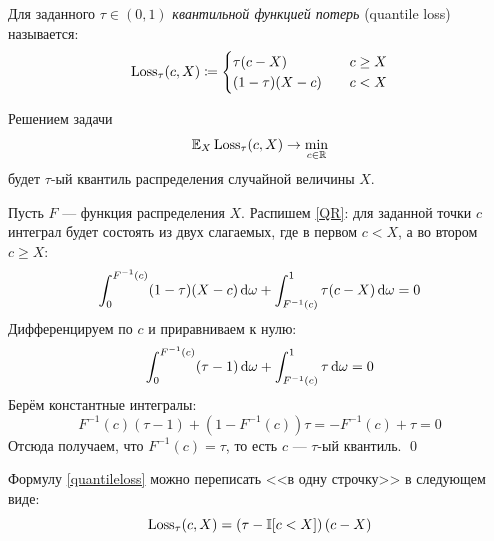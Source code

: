 \begin{definition}
Для заданного $\tau \in (0, 1)$ \emph{квантильной функцией потерь} (quantile loss) называется:
\begin{equation}\label{quantileloss}
\operatorname{Loss}_{\tau}(c, X) \coloneqq \begin{cases}
\tau (c - X) \quad &c \ge X \\
(1 - \tau) (X - c) \quad &c < X \\
\end{cases}
\end{equation}
\end{definition}

\begin{theorem} Решением задачи
\begin{equation}\label{QR}
\mathbb{E}_X \operatorname{Loss}_{\tau}(c, X) \to \min_{c \in \mathbb{R}}
\end{equation}
будет $\tau$-ый квантиль распределения случайной величины $X$.

\beginproof
Пусть $F$ --- функция распределения $X$. Распишем \eqref{QR}: для заданной точки $c$ интеграл будет состоять из двух слагаемых, где в первом $c < X$, а во втором $c \ge X$:
\begin{equation*}
\int_0^{F^{-1}(c)} (1 - \tau)(X - c) \mathop{}\!\mathrm{d} \omega + \int_{F^{-1}(c)}^1 \tau (c - X) \mathop{}\!\mathrm{d} \omega = 0 
\end{equation*}
Дифференцируем по $c$ и приравниваем к нулю:
\begin{equation*}
\int_0^{F^{-1}(c)} (\tau - 1) \mathop{}\!\mathrm{d} \omega + \int_{F^{-1}(c)}^1 \tau \mathop{}\!\mathrm{d} \omega = 0 
\end{equation*}
Берём константные интегралы:
\begin{equation*}
F^{-1}(c)(\tau - 1) + (1 - F^{-1}(c)) \tau = -F^{-1}(c) + \tau = 0
\end{equation*}
Отсюда получаем, что $F^{-1}(c) = \tau$, то есть $c$ --- $\tau$-ый квантиль. \qed
\end{theorem}

\begin{proposition}
Формулу \eqref{quantileloss} можно переписать <<в одну строчку>> в следующем виде:
$$\operatorname{Loss}_{\tau}(c, X) = \left( \tau - \mathbb{I}[c < X] \right) \left( c - X \right)$$
\end{proposition}

